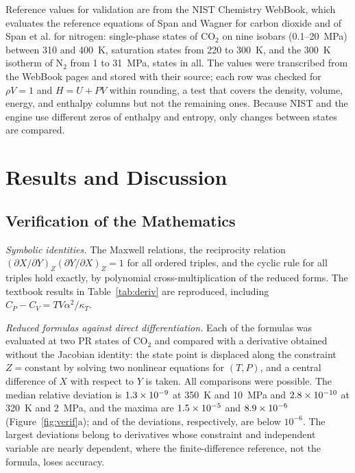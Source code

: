 \documentclass[journal=iecred,manuscript=article,layout=twocolumn]{achemso}
\begin{document}
Reference values for validation are from the NIST Chemistry
WebBook,\cite{NISTWebBook} which evaluates the reference equations of Span and
Wagner\cite{Span1996} for carbon dioxide and of Span et al.\cite{Span2000} for
nitrogen: \NNistCOtwo{} single-phase states of CO$_2$ on nine isobars
(0.1--20~MPa) between 310 and 400~K, saturation states from 220 to 300~K, and
the 300~K isotherm of N$_2$ from 1 to 31~MPa, \NNistTotal{} states in all. The
values were transcribed from the WebBook pages and stored with their source;
each row was checked for $\rho V = 1$ and $H = U + PV$ within rounding, a test
that covers the density, volume, energy, and enthalpy columns but not the
remaining ones. Because NIST and the engine use different zeros of enthalpy and
entropy, only changes between states are compared.

\section{Results and Discussion}

\subsection{Verification of the Mathematics}

\emph{Symbolic identities.} The \NMaxwell{} Maxwell relations, the reciprocity
relation $(\partial X/\partial Y)_Z(\partial Y/\partial X)_Z = 1$ for all
\NRecip{} ordered triples, and the cyclic rule for all \NCyclic{} triples hold
exactly, by polynomial cross-multiplication of the reduced forms. The textbook
results in Table~\ref{tab:deriv} are reproduced, including
$C_P - C_V = TV\alpha^2/\kappa_T$.

\emph{Reduced formulas against direct differentiation.} Each of the
\NDerivTotal{} formulas was evaluated at two PR states of CO$_2$ and compared
with a derivative obtained without the Jacobian identity: the state point is
displaced along the constraint $Z = \text{constant}$ by solving two nonlinear
equations for $(T,P)$, and a central difference of $X$ with respect to $Y$ is
taken. All \NDerivChecked{} comparisons were possible. The median relative
deviation is $1.3 \times 10^{-9}$ at 350~K and 10~MPa and $2.8 \times 10^{-10}$ at
320~K and 2~MPa, and the maxima are $1.5 \times 10^{-5}$ and $8.9 \times 10^{-6}$
(Figure~\ref{fig:verif}a); \DerivNBelowSC{} and \DerivNBelowGas{} of the
\NDerivTotal{} deviations, respectively, are below $10^{-6}$. The largest
deviations belong to derivatives whose constraint and independent variable are
nearly dependent, where the finite-difference reference, not the formula, loses
accuracy.
\end{document}
